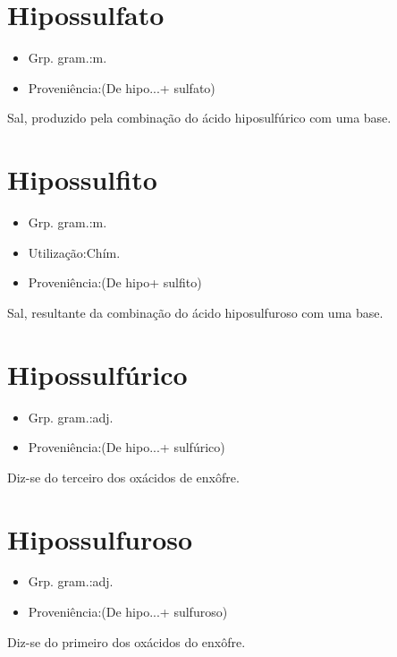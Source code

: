 \documentclass{article}
\begin{document}
\section{Hipossulfato}
\begin{itemize}
\item {Grp. gram.:m.}
\end{itemize}
\begin{itemize}
\item {Proveniência:(De \textunderscore hipo...\textunderscore  + \textunderscore sulfato\textunderscore )}
\end{itemize}
Sal, produzido pela combinação do ácido hiposulfúrico com uma base.
\section{Hipossulfito}
\begin{itemize}
\item {Grp. gram.:m.}
\end{itemize}
\begin{itemize}
\item {Utilização:Chím.}
\end{itemize}
\begin{itemize}
\item {Proveniência:(De \textunderscore hipo\textunderscore  + \textunderscore sulfito\textunderscore )}
\end{itemize}
Sal, resultante da combinação do ácido hiposulfuroso com uma base.
\section{Hipossulfúrico}
\begin{itemize}
\item {Grp. gram.:adj.}
\end{itemize}
\begin{itemize}
\item {Proveniência:(De \textunderscore hipo...\textunderscore  + \textunderscore sulfúrico\textunderscore )}
\end{itemize}
Diz-se do terceiro dos oxácidos de enxôfre.
\section{Hipossulfuroso}
\begin{itemize}
\item {Grp. gram.:adj.}
\end{itemize}
\begin{itemize}
\item {Proveniência:(De \textunderscore hipo...\textunderscore  + \textunderscore sulfuroso\textunderscore )}
\end{itemize}
Diz-se do primeiro dos oxácidos do enxôfre.
\end{document}
